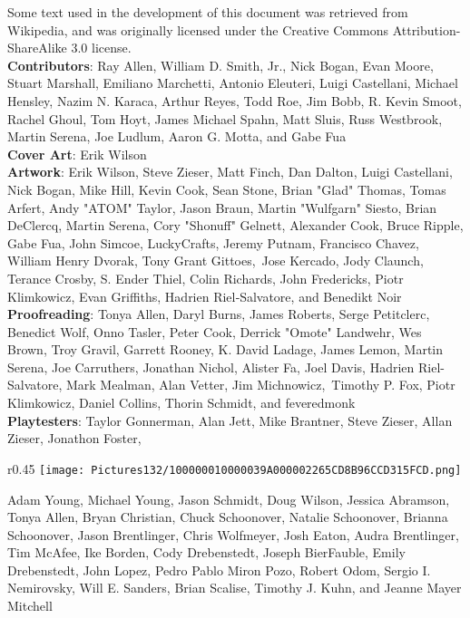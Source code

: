\documentclass[a4paper,twoside,openany,10pt]{book}
\begin{document}
Some text used in the development of this document was retrieved from Wikipedia, and was originally licensed under the Creative Commons Attribution-ShareAlike 3.0 license.\\

\textbf{Contributors}: Ray Allen, William D. Smith, Jr., Nick Bogan, Evan Moore, Stuart Marshall, Emiliano Marchetti, Antonio Eleuteri, Luigi Castellani, Michael Hensley, Nazim N. Karaca, Arthur Reyes, Todd Roe, Jim Bobb, R. Kevin Smoot, Rachel Ghoul, Tom Hoyt, James Michael Spahn, Matt Sluis, Russ Westbrook, Martin Serena, Joe Ludlum, Aaron G. Motta, and Gabe Fua\\

\textbf{Cover Art}: Erik Wilson\\

\textbf{Artwork}: Erik Wilson, Steve Zieser, Matt Finch, Dan Dalton, Luigi Castellani, Nick Bogan, Mike Hill, Kevin Cook, Sean Stone, Brian "Glad" Thomas, Tomas Arfert, Andy "ATOM" Taylor, Jason Braun, Martin "Wulfgarn" Siesto, Brian DeClercq, Martin Serena, Cory "Shonuff" Gelnett, Alexander Cook, Bruce Ripple, Gabe Fua, John Simcoe, LuckyCrafts, Jeremy Putnam, Francisco Chavez, William Henry Dvorak, Tony Grant Gittoes, \,Jose Kercado, Jody Claunch, Terance Crosby, S. Ender Thiel, Colin Richards, John Fredericks, Piotr Klimkowicz, Evan Griffiths, Hadrien Riel‑Salvatore, and Benedikt Noir\\

\textbf{Proofreading}: Tonya Allen, Daryl Burns, James Roberts, Serge Petitclerc, Benedict Wolf, Onno Tasler, Peter Cook, Derrick "Omote" Landwehr, Wes Brown, Troy Gravil, Garrett Rooney, K. David Ladage, James Lemon, Martin Serena, Joe Carruthers, Jonathan Nichol, Alister Fa, Joel Davis, Hadrien Riel-Salvatore, Mark Mealman, Alan Vetter, Jim Michnowicz, \,Timothy P. Fox, Piotr Klimkowicz, Daniel Collins, Thorin Schmidt, and feveredmonk\\

\textbf{Playtesters}: Taylor Gonnerman, Alan Jett, Mike Brantner, Steve Zieser, Allan Zieser, Jonathon Foster, 
\begin{wrapfigure}{r}{0.45\textwidth}
	\texttt{[image: Pictures132/100000010000039A000002265CD8B96CCD315FCD.png]}
\end{wrapfigure}
Adam Young, Michael Young, Jason Schmidt, Doug Wilson, Jessica Abramson, Tonya Allen, Bryan Christian, Chuck Schoonover, Natalie Schoonover, Brianna Schoonover, Jason Brentlinger, Chris Wolfmeyer, Josh Eaton, Audra Brentlinger, Tim McAfee, Ike Borden, Cody Drebenstedt, Joseph BierFauble, Emily Drebenstedt, John Lopez, Pedro Pablo Miron Pozo, Robert Odom, Sergio I. Nemirovsky, Will E. Sanders, Brian Scalise, Timothy J. Kuhn, and Jeanne Mayer Mitchell\\
\end{document}
